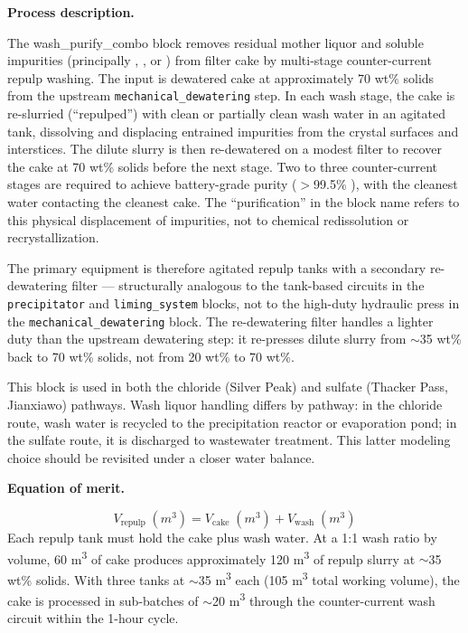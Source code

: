 \medskip
\noindent\textbf{Process description.}\quad

The wash\_purify\_combo block removes residual mother liquor and soluble impurities (principally , ,  or ) from  filter cake by multi-stage counter-current repulp washing. The input is dewatered  cake at approximately 70 wt\% solids from the upstream \texttt{mechanical\_dewatering} step. In each wash stage, the cake is re-slurried (``repulped'') with clean or partially clean wash water in an agitated tank, dissolving and displacing entrained impurities from the crystal surfaces and interstices. The dilute slurry is then re-dewatered on a modest filter to recover the cake at 70 wt\% solids before the next stage. Two to three counter-current stages are required to achieve battery-grade purity ($>$99.5\% ), with the cleanest water contacting the cleanest cake. The ``purification'' in the block name refers to this physical displacement of impurities, not to chemical redissolution or recrystallization.

The primary equipment is therefore agitated repulp tanks with a secondary re-dewatering filter --- structurally analogous to the tank-based circuits in the \texttt{precipitator} and \texttt{liming\_system} blocks, not to the high-duty hydraulic press in the \texttt{mechanical\_dewatering} block. The re-dewatering filter handles a lighter duty than the upstream dewatering step: it re-presses dilute slurry from $\sim$35 wt\% back to 70 wt\% solids, not from 20 wt\% to 70 wt\%.

This block is used in both the chloride (Silver Peak) and sulfate (Thacker Pass, Jianxiawo) pathways. Wash liquor handling differs by pathway: in the chloride route, wash water is recycled to the precipitation reactor or evaporation pond; in the sulfate route, it is discharged to wastewater treatment. This latter modeling choice should be revisited under a closer water balance. 

\medskip
\noindent\textbf{Equation of merit.}\quad

\[
	V_\text{repulp}\;(\si{m^3}) = V_\text{cake}\;(\si{m^3}) + V_\text{wash}\;(\si{m^3})
\]
Each repulp tank must hold the cake plus wash water. At a 1:1 wash ratio by volume, 60 \si{m^3} of cake produces approximately 120 \si{m^3} of repulp slurry at $\sim$35 wt\% solids. With three tanks at $\sim$35 \si{m^3} each (105 \si{m^3} total working volume), the cake is processed in sub-batches of $\sim$20 \si{m^3} through the counter-current wash circuit within the 1-hour cycle.

